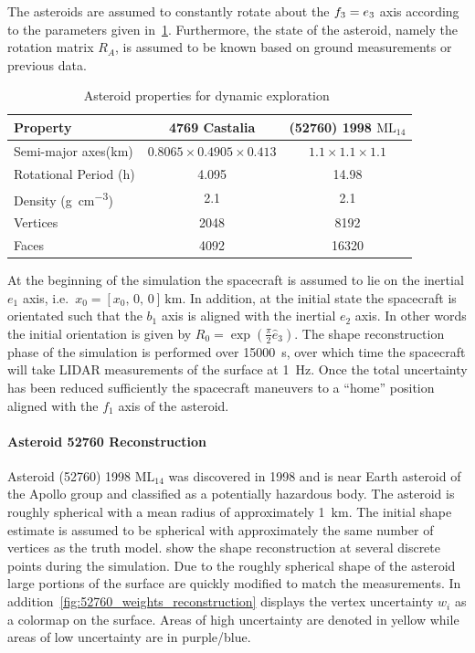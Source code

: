 \documentclass[journal]{new-aiaa}
\begin{document}
The asteroids are assumed to constantly rotate about the \( f_3 = e_3\) axis according to the parameters given in~\cref{tab:dynamic_asteroids}.
Furthermore, the state of the asteroid, namely the rotation matrix \( R_A \), is assumed to be known based on ground measurements or previous data.
\begin{table}[htbp]
    \centering
    \begin{tabular}{lcc}
        \toprule
        Property & \num{4769} Castalia & (\num{52760}) \num{1998} \(\text{ML}_{14}\) \\
        \midrule
        Semi-major axes(\si{\kilo\meter}) & \( 0.8065 \times 0.4905 \times 0.413 \) & \( 1.1 \times 1.1 \times 1.1 \) \\
        Rotational Period (\si{\hour}) & \num{4.095} & \num{14.98} \\
        Density (\si{\gram\per\centi\meter^3}) & \num{2.1} & \num{2.1} \\
        Vertices & \num{2048}  & \num{8192} \\
        Faces & \num{4092} & \num{16320} \\
        \bottomrule
    \end{tabular}
    \caption{Asteroid properties for dynamic exploration~\label{tab:dynamic_asteroids}}
\end{table}
At the beginning of the simulation the spacecraft is assumed to lie on the inertial \( e_1 \) axis, i.e.\ \( x_0 = [ x_0,\, 0,\,  0 ]\, \si{\kilo\meter} \).
In addition, at the initial state the spacecraft is orientated such that the \( b_1 \) axis is aligned with the inertial \( e_2 \) axis.
In other words the initial orientation is given by \( R_0 = \exp(\frac{\pi}{2} \hat{e}_3)\).
The shape reconstruction phase of the simulation is performed over \SI{15000}{\second}, over which time the spacecraft will take LIDAR measurements of the surface at \SI{1}{\hertz}.
Once the total uncertainty has been reduced sufficiently the spacecraft maneuvers to a ``home'' position aligned with the \( f_1 \) axis of the asteroid.

\paragraph{Asteroid 52760 Reconstruction}

Asteroid (\num{52760}) \num{1998} \(\text{ML}_{14}\) was discovered in \num{1998} and is near Earth asteroid of the Apollo group and classified as a potentially hazardous body.
The asteroid is roughly spherical with a mean radius of approximately \SI{1}{\kilo\meter}.
The initial shape estimate is assumed to be spherical with approximately the same number of vertices as the truth model.
 show the shape reconstruction at several discrete points during the simulation.
Due to the roughly spherical shape of the asteroid large portions of the surface are quickly modified to match the measurements.
In addition~\cref{fig:52760_weights_reconstruction} displays the vertex uncertainty \( w_i \) as a colormap on the surface. 
Areas of high uncertainty are denoted in yellow while areas of low uncertainty are in purple/blue.
\end{document}
